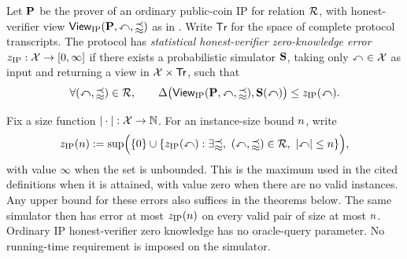 \begin{definition}
  \label{def:hvzk}
  Let \(\mathbf{P}\) be the prover of an ordinary public-coin IP for relation \(\mathcal{R}\), with honest-verifier view \(\mathsf{View}_{\mathrm{IP}}(\mathbf{P},\mathbb{x},\mathbb{w})\) as in . Write \(\mathsf{Tr}\) for the space of complete protocol transcripts. The protocol has \emph{statistical honest-verifier zero-knowledge error} \(z_{\mathrm{IP}}:\mathcal X\to[0,\infty]\) if there exists a probabilistic simulator \(\mathbf S\), taking only \(\mathbb{x}\in\mathcal X\) as input and returning a view in \(\mathcal X\times\mathsf{Tr}\), such that
  \begin{equation*}
    \forall(\mathbb{x},\mathbb{w})\in\mathcal{R},\qquad
    \Delta\bigl(
      \mathsf{View}_{\mathrm{IP}}(\mathbf{P},\mathbb{x},\mathbb{w}),\mathbf S(\mathbb{x})
    \bigr)\leq z_{\mathrm{IP}}(\mathbb{x}).
  \end{equation*}

  Fix a size function \(|\cdot|:\mathcal X\to\mathbb N\). For an instance-size bound \(n\), write
  \[
    \IPHVZKError(\InstanceSizeBound)
      :=\sup\Bigl(\{0\}\cup\{\IPHVZKError(\Instance):
        \exists\WitnessValue,\ (\Instance,\WitnessValue)\in\Relation,
        \ \InstanceSizeOf{\Instance}\le\InstanceSizeBound\}\Bigr),
  \]
  with value \(\infty\) when the set is unbounded. This is the maximum used in the cited definitions when it is attained, with value zero when there are no valid instances. Any upper bound for these errors also suffices in the theorems below. The same simulator then has error at most \(z_{\mathrm{IP}}(n)\) on every valid pair of size at most \(n\). Ordinary IP honest-verifier zero knowledge has no oracle-query parameter. No running-time requirement is imposed on the simulator.
  \leanok
\end{definition}
